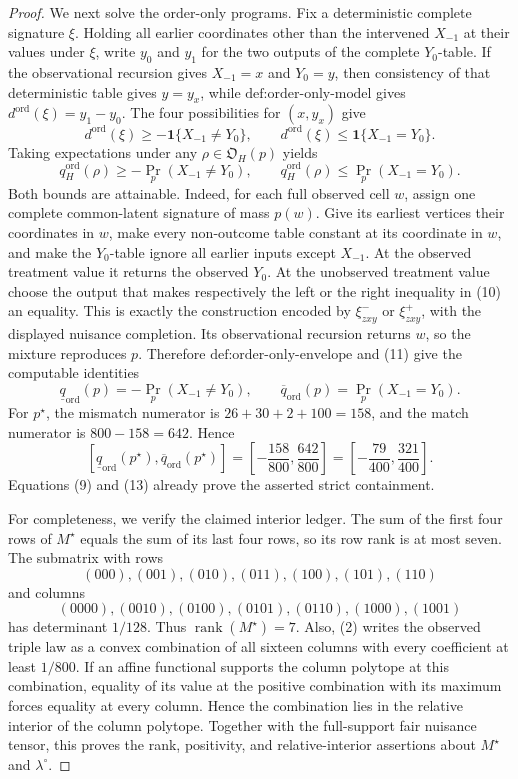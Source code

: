 \documentclass{article}
\begin{document}
\begin{proof}
We next solve the order-only programs.  Fix a deterministic complete signature \(\xi\).  Holding all earlier coordinates other than the intervened \(X_{-1}\) at their values under \(\xi\), write \(y_0\) and \(y_1\) for the two outputs of the complete \(Y_0\)-table.  If the observational recursion gives \(X_{-1}=x\) and \(Y_0=y\), then consistency of that deterministic table gives \(y=y_x\), while \(\text{def:order-only-model}\) gives \(d^{\mathrm{ord}}(\xi)=y_1-y_0\).  The four possibilities for \((x,y_x)\) give
\[
d^{\mathrm{ord}}(\xi)\ge-\mathbf 1\{X_{-1}\ne Y_0\},
\qquad
d^{\mathrm{ord}}(\xi)\le\mathbf 1\{X_{-1}=Y_0\}.
\tag{10}
\]
Taking expectations under any \(\rho\in\mathfrak O_H(p)\) yields
\[
q_H^{\mathrm{ord}}(\rho)\ge-\Pr_p(X_{-1}\ne Y_0),
\qquad
q_H^{\mathrm{ord}}(\rho)\le\Pr_p(X_{-1}=Y_0).
\tag{11}
\]
Both bounds are attainable.  Indeed, for each full observed cell \(w\), assign one complete common-latent signature of mass \(p(w)\).  Give its earliest vertices their coordinates in \(w\), make every non-outcome table constant at its coordinate in \(w\), and make the \(Y_0\)-table ignore all earlier inputs except \(X_{-1}\).  At the observed treatment value it returns the observed \(Y_0\).  At the unobserved treatment value choose the output that makes respectively the left or the right inequality in (10) an equality.  This is exactly the construction encoded by \(\xi_{zxy}^-\) or \(\xi_{zxy}^+\), with the displayed nuisance completion.  Its observational recursion returns \(w\), so the mixture reproduces \(p\).  Therefore \(\text{def:order-only-envelope}\) and (11) give the computable identities
\[
\underline q_{\mathrm{ord}}(p)=-\Pr_p(X_{-1}\ne Y_0),
\qquad
\overline q_{\mathrm{ord}}(p)=\Pr_p(X_{-1}=Y_0).
\tag{12}
\]
For \(p^{\star}\), the mismatch numerator is \(26+30+2+100=158\), and the match numerator is \(800-158=642\).  Hence
\[
[\underline q_{\mathrm{ord}}(p^{\star}),\overline q_{\mathrm{ord}}(p^{\star})]
=\left[-\frac{158}{800},\frac{642}{800}\right]
=\left[-\frac{79}{400},\frac{321}{400}\right].
\tag{13}
\]
Equations (9) and (13) already prove the asserted strict containment.

For completeness, we verify the claimed interior ledger.  The sum of the first four rows of \(M^{\star}\) equals the sum of its last four rows, so its row rank is at most seven.  The submatrix with rows
\[
(000),(001),(010),(011),(100),(101),(110)
\]
and columns
\[
(0000),(0010),(0100),(0101),(0110),(1000),(1001)
\]
has determinant \(1/128\).  Thus \(\operatorname{rank}(M^{\star})=7\).  Also, (2) writes the observed triple law as a convex combination of all sixteen columns with every coefficient at least \(1/800\).  If an affine functional supports the column polytope at this combination, equality of its value at the positive combination with its maximum forces equality at every column.  Hence the combination lies in the relative interior of the column polytope.  Together with the full-support fair nuisance tensor, this proves the rank, positivity, and relative-interior assertions about \(M^{\star}\) and \(\lambda^{\circ}\).


\end{proof}
\end{document}
